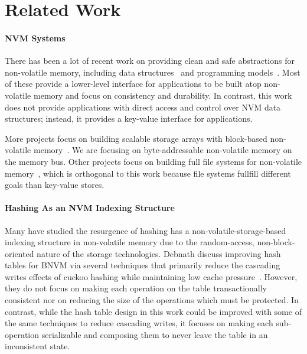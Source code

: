\section{Related Work}

\paragraph{NVM Systems}

There has been a lot of recent work on providing clean and safe abstractions for
non-volatile memory, including data
structures~\cite{coburn:asplos11,hu:atc17,Yang:2015,Venkataraman:2011} and programming
models~\cite{ren:micro15,volos:asplos11,condit:sosp09,guerra:atc12,Narayanan:2012}.
Most of these provide a lower-level interface for applications
to be built atop non-volatile memory and focus on consistency and durability. In contrast, this work does not provide
applications with direct access and control over NVM data structures; instead,
it provides a key-value interface for applications.

More projects focus on building scalable storage arrays with block-based
non-volatile memory~\cite{Marmol:2014,caulfield:micro10,lim:sosp11,wu:atc15,debnath:vldb10}. We are focusing
on byte-addressable non-volatile memory on the memory bus. Other projects focus
on building full file systems for non-volatile
memory~\cite{wu:asplos94,xu:fast16,xu:sosp17,dulloor:eurosys14}, which is orthogonal to this work because file
systems fullfill different goals than key-value stores.

\paragraph{Hashing As an NVM Indexing Structure}

Many have studied the resurgence of hashing has a non-volatile-storage-based
indexing structure in non-volatile memory due to the random-access,
non-block-oriented nature of the storage technologies. Debnath \etal discuss
improving hash tables for BNVM via several techniques that primarily reduce the
cascading writes effects of cuckoo hashing while maintaining low cache
pressure~\cite{Debnath:2016ht}.
However, they do not focus on making each operation on the table transactionally
consistent nor on reducing the size of the operations which must be protected.
In contrast, while the hash table design in this work could be improved with
some of the same techniques to reduce cascading writes, it focuses on making
each sub-operation serializable and composing them to never leave the table in
an inconsistent state.

